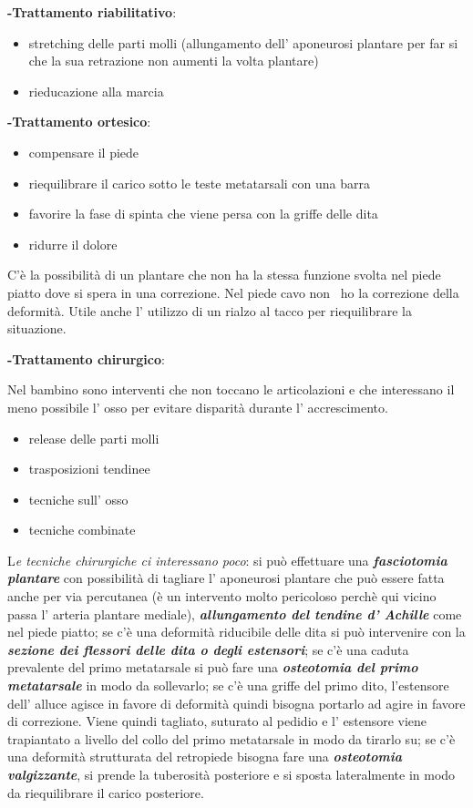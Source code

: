 \documentclass[]{article}
\begin{document}
\textbf{-Trattamento riabilitativo}:

\begin{itemize}
\item
  stretching delle parti molli (allungamento dell' aponeurosi plantare
  per far si che la sua retrazione non aumenti la volta plantare)
\item
  rieducazione alla marcia
\end{itemize}

\textbf{-Trattamento ortesico}:

\begin{itemize}
\item
  compensare il piede
\item
  riequilibrare il carico sotto le teste metatarsali con una barra
\item
  favorire la fase di spinta che viene persa con la griffe delle dita
\item
  ridurre il dolore
\end{itemize}

C'è la possibilità di un plantare che non ha la stessa funzione svolta
nel piede piatto dove si spera in una correzione. Nel piede cavo non ~ho
la correzione della deformità. Utile anche l' utilizzo di un rialzo al
tacco per riequilibrare la situazione.

\textbf{-Trattamento chirurgico}:

Nel bambino sono interventi che non toccano le articolazioni e che
interessano il meno possibile l' osso per evitare disparità durante l'
accrescimento.

\begin{itemize}
\item
  release delle parti molli
\item
  trasposizioni tendinee
\item
  tecniche sull' osso
\item
  tecniche combinate
\end{itemize}

L\emph{e tecniche chirurgiche ci interessano poco}: si può effettuare
una \textbf{\emph{fasciotomia plantare}} con possibilità di tagliare l'
aponeurosi plantare che può essere fatta anche per via percutanea (è un
intervento molto pericoloso perchè qui vicino passa l' arteria plantare
mediale), \textbf{\emph{allungamento del tendine d' Achille}} come nel
piede piatto; se c'è una deformità riducibile delle dita si può
intervenire con la \textbf{\emph{sezione dei flessori delle dita o degli
estensori}}; se c'è una caduta prevalente del primo metatarsale si può
fare una \textbf{\emph{osteotomia del primo metatarsale}} in modo da
sollevarlo; se c'è una griffe del primo dito, l'estensore dell' alluce
agisce in favore di deformità quindi bisogna portarlo ad agire in favore
di correzione. Viene quindi tagliato, suturato al pedidio e l' estensore
viene trapiantato a livello del collo del primo metatarsale in modo da
tirarlo su; se c'è una deformità strutturata del retropiede bisogna fare
una \textbf{\emph{osteotomia valgizzante}}, si prende la tuberosità
posteriore e si sposta lateralmente in modo da riequilibrare il carico
posteriore.
\end{document}
